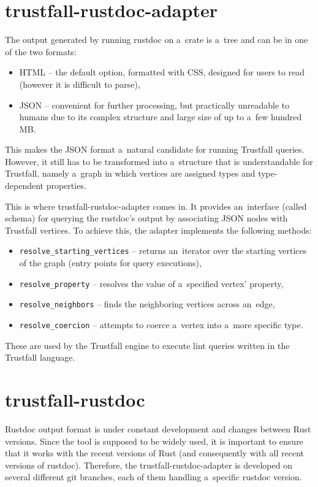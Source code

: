 \documentclass[licencjacka,en]{pracamgr}
\begin{document}
\section{trustfall-rustdoc-adapter}\label{r:section_trustfall_rustdoc_adapter}
The output generated by running rustdoc on a~crate is a~tree and can be in one of the two formats:
\begin{itemize}
	\item HTML -- the default option, formatted with CSS, designed for users to read (however it is
		difficult to parse),
	\item JSON -- convenient for further processing, but practically unreadable to humans due to its
		complex structure and large size of up to a~few hundred MB.
\end{itemize}
This makes the JSON format a~natural candidate for running Trustfall queries. However, it still has
to be transformed into a~structure that is understandable for Trustfall, namely a~graph in which
vertices are assigned types and type-dependent properties.

This is where trustfall-rustdoc-adapter comes in. It provides an~interface (called schema) for querying
the rustdoc's output by associating JSON nodes with Trustfall vertices. To achieve this, the adapter
implements the following methods:
\begin{itemize}
	\item \texttt{resolve\_starting\_vertices} -- returns an~iterator over the starting vertices of
		the graph (entry points for query executions),
	\item \texttt{resolve\_property} -- resolves the value of a~specified vertex' property,
	\item \texttt{resolve\_neighbors} -- finds the neighboring vertices across an~edge,
	\item \texttt{resolve\_coercion} -- attempts to coerce a~vertex into a~more specific type.
\end{itemize}
These are used by the Trustfall engine to execute lint queries written in the Trustfall language.

\section{trustfall-rustdoc}\label{r:section_trustfall_rustdoc}

Rustdoc output format is under constant development and changes between Rust versions.
Since the tool is supposed to be widely used, it is important to ensure that it works with
the recent versions of Rust (and consequently with all recent versions of rustdoc).
Therefore, the trustfall-rustdoc-adapter is developed on several different git branches,
each of them handling a~specific rustdoc version.
\end{document}
